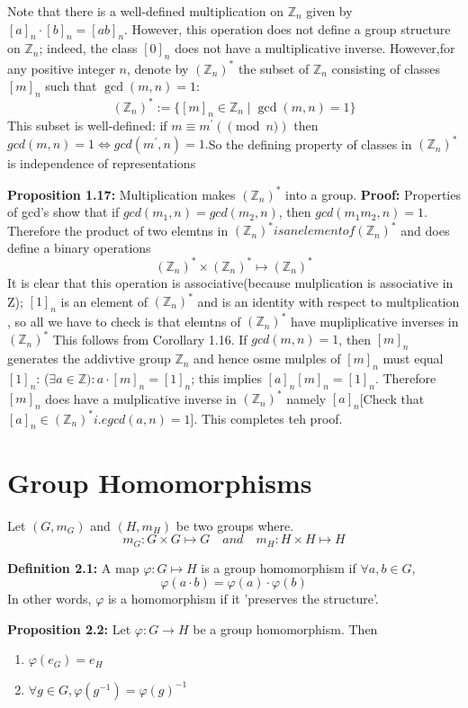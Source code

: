 Note that there is a well-defined multiplication on $\mathbb{Z}_n$ given by $[a]_n \cdot [b]_n = [ab]_n$. However, this operation does not define a group structure on $\mathbb{Z}_n$; indeed, the class $[0]_n$ does not have a multiplicative inverse.
However,for any positive integer $n$, denote by $(\mathbb{Z}_n)^*$ the subset of $\mathbb{Z}_n$ consisting of classes $[m]_n$ such that $\gcd(m,n) = 1$:
$$ (\mathbb{Z}_n)^* := \{ [m]_n \in \mathbb{Z}_n \mid \gcd(m,n) = 1 \} $$
This subset is well-defined: if $m \equiv m^\prime (\pmod n)$ then $gcd(m,n) =1 \iff gcd(m^\prime,n) =1.$So the defining property of classes in $(\mathbb{Z}_n)^* $ is independence of representations


\textbf{Proposition 1.17:} Multiplication makes $(\mathbb{Z}_n)^*$ into a group.
\textbf{Proof:} Properties of gcd's show that if $gcd(m_1,n) = gcd(m_2,n)$, then $gcd(m_1m_2,n) = 1. $Therefore the product of two elemtns in $(\mathbb{Z}_n)^* is an element of (\mathbb{Z}_n)^*$ and does define a binary operations
$$(\mathbb{Z}_n)^* \times (\mathbb{Z}_n)^* \mapsto (\mathbb{Z}_n)^*$$
It is clear that this operation is associative(because mulplication is associative in Z); $[1]_n$ is an element of $(\mathbb{Z}_n)^*$ and is an identity with respect to multplication , so all we have to check is that elemtns of $(\mathbb{Z}_n)^*$ have mupliplicative inverses in $(\mathbb{Z}_n)^*$
This follows from Corollary 1.16. If $gcd(m,n) = 1 $, then $[m]_n$ generates the addivtive group $\mathbb{Z}_n$ and hence osme mulples of $[m]_n$ must equal $[1]_n$: ($\exists a \in \mathbb{Z}): a \cdot [m]_n = [1]_n$;
this implies $[a]_n[m]_n = [1]_n$. Therefore $[m]_n$ does have a mulplicative inverse in $(\mathbb{Z}_n)^*$ namely $[a]_n $[Check that $[a]_n \in (\mathbb{Z}_n)^* i.e gcd(a,n) =1 $]. This completes teh proof.

\section*{Group Homomorphisms}

Let $(G, m_G)$ and $(H, m_H)$ be two groups where.
$$ m_G : G \times G \mapsto G \quad and \quad m_H : H \times H \mapsto H$$

\textbf{Definition 2.1:} A map $\varphi : G \mapsto H$ is a group homomorphism if $\forall a, b \in G$,
$$ \varphi(a \cdot b) = \varphi(a) \cdot \varphi(b) $$
In other words, $\varphi$ is a homomorphism if it 'preserves the structure'.

\textbf{Proposition 2.2:} Let $\varphi : G \to H$ be a group homomorphism. Then
\begin{enumerate}
    \item $\varphi(e_G) = e_H$
    \item $\forall g \in G, \varphi(g^{-1}) = \varphi(g)^{-1}$
\end{enumerate}

